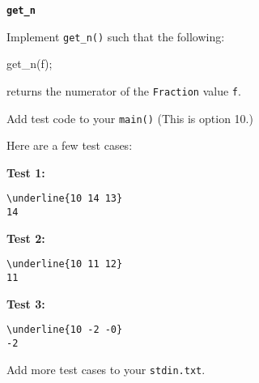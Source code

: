 \textbf{\texttt{get\_n}}

Implement \verb!get_n()! such that the following:
\begin{console}
get_n(f);
\end{console}
returns the numerator of the \verb!Fraction! value \verb!f!.

Add test code to your \verb!main()!
(This is option 10.)


Here are a few test cases:

\textbf{Test 1:}
\begin{Verbatim}[frame=single, commandchars=\\\{\}]
\underline{10 14 13}
14
\end{Verbatim}

\textbf{Test 2:}
\begin{Verbatim}[frame=single, commandchars=\\\{\}]
\underline{10 11 12}
11
\end{Verbatim}

\textbf{Test 3:}
\begin{Verbatim}[frame=single, commandchars=\\\{\}]
\underline{10 -2 -0}
-2
\end{Verbatim}

Add more test cases to your \verb!stdin.txt!.
